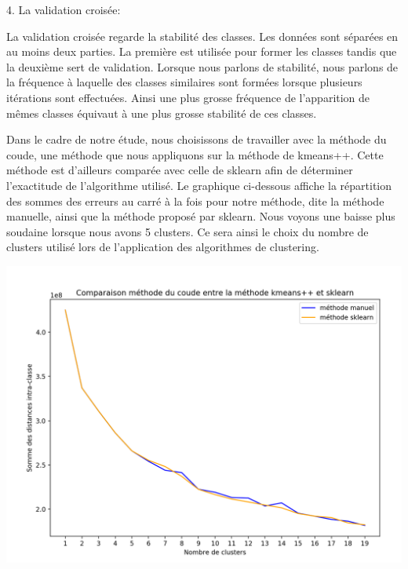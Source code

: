 \documentclass[ ]{article}
\begin{document}
\begin{description}
 	 \item 4. La validation croisée:
 	 
La validation croisée regarde la stabilité des classes. Les données sont séparées en au moins deux parties. La première est utilisée pour former les classes tandis que la deuxième sert de validation. Lorsque nous parlons de stabilité, nous parlons de la fréquence à laquelle des classes similaires sont formées lorsque plusieurs itérations sont effectuées. Ainsi une plus grosse fréquence de l’apparition de mêmes classes équivaut à une plus grosse stabilité de ces classes.
 	 
\end{description}

\noindent
Dans le cadre de notre étude, nous choisissons de travailler avec la méthode du coude, une méthode que nous appliquons sur la méthode de kmeans++. Cette méthode est d'ailleurs comparée avec celle de sklearn afin de déterminer l'exactitude de l'algorithme utilisé. Le graphique ci-dessous affiche la répartition des sommes des erreurs au carré à la fois pour notre méthode, dite la méthode manuelle, ainsi que la méthode proposé par sklearn. Nous voyons une baisse plus soudaine lorsque nous avons 5 clusters. Ce sera ainsi le choix du nombre de clusters utilisé lors de l'application des algorithmes de clustering.

\begin{center}
\includegraphics[scale=0.50]{Comparaison_elbow.png}
\end{center}
\end{document}
